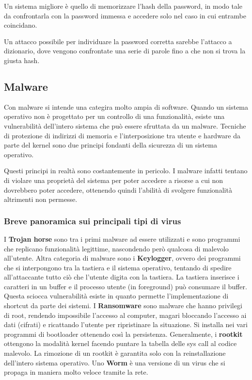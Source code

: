 \documentclass[a4]{article}
\begin{document}
Un sistema migliore è quello di memorizzare l’hash della password, in modo tale da confrontarla con la password immessa e accedere solo nel caso in cui entrambe coincidano.

Un attacco possibile per individuare la password corretta sarebbe l'attacco a dizionario, dove vengono confrontate una serie di
parole fino a che non si trova la giusta hash.

\subsection{Malware}
Con malware si intende una categira molto ampia di software. Quando un sistema operativo non è progettato per un controllo di una funzionalità, esiste una vulnerabilità dell'intero sistema che può essere sfruttata da un malware. Tecniche di protezione di indirizzi di memoria e l'interposizione tra utente e hardware da parte del kernel sono due principi fondanti della sicurezza di un sistema operativo.

Questi principi in realtà sono costantemente in pericolo. I malware infatti tentano di violare una proprietà del sistema per poter accedere a risorse a cui non dovrebbero poter accedere, ottenendo quindi l'abilità di svolgere funzionalità altrimenti non permesse.

\subsubsection{Breve panoramica sui principali tipi di virus}
I \textbf{Trojan horse} sono tra i primi malware ad essere utilizzati e sono programmi che replicano funzionalità legittime, nascondendo però qualcosa di malevolo all'utente. Altra categoria di malware sono i \textbf{Keylogger}, ovvero dei programmi che si interpongono tra la tastiera e il sistema operativo, tentando di spedire all'attaccante tutto ciò che l'utente digita con la tastiera. La tastiera inserisce i caratteri in un buffer e il processo utente (in foreground) può consumare il buffer. Questa sciocca vulnerabilità esiste in quanto permette l'implementazione di shortcut da parte dei sistemi. I \textbf{Ransomware} sono malware che hanno privilegi di root, rendendo impossibile l'accesso al computer, magari bloccando l'accesso ai dati (cifrati) e ricattando l'utente per ripristinare la situazione. Si installa nei vari programmi di bootloader ottenendo così la persistenza. Generalmente, i \textbf{rootkit} ottengono la modalità kernel facendo puntare la tabella delle sys call al codice malevolo. La rimozione di un rootkit è garantita solo con la reinstallazione dell'intero sistema operativo. Uno \textbf{Worm} è una versione di un virus che si propaga in maniera molto veloce tramite la rete.
\end{document}
